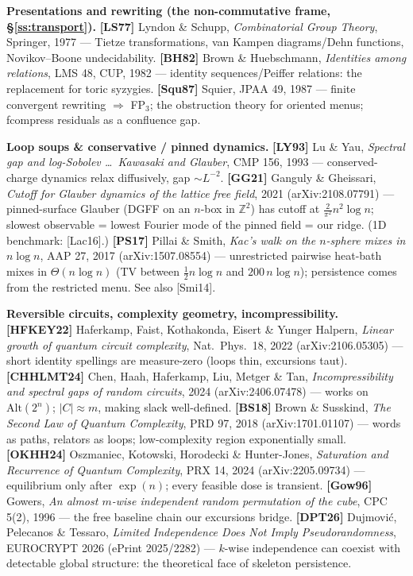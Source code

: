 \documentclass[11pt]{article}
\begin{document}
\textbf{Presentations and rewriting (the non-commutative frame, \S\ref{ss:transport}).}
\textbf{[LS77]} Lyndon \& Schupp, \emph{Combinatorial Group Theory}, Springer, 1977 --- Tietze
transformations, van Kampen diagrams/Dehn functions, Novikov--Boone undecidability.
\textbf{[BH82]} Brown \& Huebschmann, \emph{Identities among relations}, LMS 48, CUP, 1982 ---
identity sequences/Peiffer relations: the replacement for toric syzygies.
\textbf{[Squ87]} Squier, JPAA 49, 1987 --- finite convergent rewriting $\Rightarrow$ FP$_3$; the
obstruction theory for oriented menus; fcompress residuals as a confluence gap.

\textbf{Loop soups \& conservative / pinned dynamics.}
\textbf{[LY93]} Lu \& Yau, \emph{Spectral gap and log-Sobolev \dots\ Kawasaki and Glauber}, CMP 156,
1993 --- conserved-charge dynamics relax diffusively, gap $\sim L^{-2}$.
\textbf{[GG21]} Ganguly \& Gheissari, \emph{Cutoff for Glauber dynamics of the lattice free field}, 2021
(arXiv:2108.07791) --- pinned-surface Glauber (DGFF on an $n$-box in $\mathbb{Z}^2$) has cutoff at
$\frac{2}{\pi^2}n^2\log n$; slowest observable = lowest Fourier mode of the pinned field = our ridge.
(1D benchmark: [Lac16].)
\textbf{[PS17]} Pillai \& Smith, \emph{Kac's walk on the $n$-sphere mixes in $n\log n$}, AAP 27, 2017
(arXiv:1507.08554) --- unrestricted pairwise heat-bath mixes in $\Theta(n\log n)$ (TV between
$\frac12 n\log n$ and $200\,n\log n$); persistence comes from the restricted menu. See also [Smi14].

\textbf{Reversible circuits, complexity geometry, incompressibility.}
\textbf{[HFKEY22]} Haferkamp, Faist, Kothakonda, Eisert \& Yunger Halpern, \emph{Linear growth of
quantum circuit complexity}, Nat.\ Phys.\ 18, 2022 (arXiv:2106.05305) --- short identity spellings are
measure-zero (loops thin, excursions taut).
\textbf{[CHHLMT24]} Chen, Haah, Haferkamp, Liu, Metger \& Tan, \emph{Incompressibility and spectral gaps
of random circuits}, 2024 (arXiv:2406.07478) --- works on $\mathrm{Alt}(2^n)$; $|C|\approx m$, making
slack well-defined.
\textbf{[BS18]} Brown \& Susskind, \emph{The Second Law of Quantum Complexity}, PRD 97, 2018
(arXiv:1701.01107) --- words as paths, relators as loops; low-complexity region exponentially small.
\textbf{[OKHH24]} Oszmaniec, Kotowski, Horodecki \& Hunter-Jones, \emph{Saturation and Recurrence of
Quantum Complexity}, PRX 14, 2024 (arXiv:2205.09734) --- equilibrium only after $\exp(n)$; every
feasible dose is transient.
\textbf{[Gow96]} Gowers, \emph{An almost $m$-wise independent random permutation of the cube}, CPC 5(2),
1996 --- the free baseline chain our excursions bridge.
\textbf{[DPT26]} Dujmovi\'c, Pelecanos \& Tessaro, \emph{Limited Independence Does Not Imply
Pseudorandomness}, EUROCRYPT 2026 (ePrint 2025/2282) --- $k$-wise independence can coexist with
detectable global structure: the theoretical face of skeleton persistence.
\end{document}
